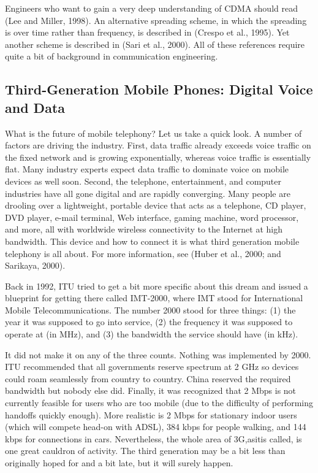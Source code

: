\documentclass[b5paper,11pt]{memoir}
\begin{document}
Engineers who want to gain a very deep understanding of CDMA should read
(Lee and Miller, 1998). An alternative spreading scheme, in which the
spreading is over time rather than frequency, is described in (Crespo et
al., 1995). Yet another scheme is described in (Sari et al., 2000). All
of these references require quite a bit of background in communication
engineering.

\protect\hypertarget{0130661023_ch02lev1sec6.htmlux5cux23ch02lev2sec24}{}{}

\subsection{Third-Generation Mobile Phones: Digital Voice and Data}

What is the future of mobile telephony? Let us take a quick look. A
number of factors are driving the industry. First, data traffic already
exceeds voice traffic on the fixed network and is growing exponentially,
whereas voice traffic is essentially flat. Many industry experts expect
data traffic to dominate voice on mobile devices as well soon. Second,
the telephone, entertainment, and computer industries have all gone
digital and are rapidly converging. Many people are drooling over a
lightweight, portable device that acts as a telephone, CD player, DVD
player, e-mail terminal, Web interface, gaming machine, word processor,
and more, all with worldwide wireless connectivity to the Internet at
high bandwidth. This device and how to connect it is what third
generation mobile telephony is all about. For more information, see
(Huber et al., 2000; and Sarikaya, 2000).

Back in 1992, ITU tried to get a bit more specific about this dream and
issued a blueprint for getting there called {IMT-2000}, where IMT stood
for {International Mobile Telecommunications}. The number 2000 stood for
three things: (1) the year it was supposed to go into service, (2) the
frequency it was supposed to operate at (in MHz), and (3) the bandwidth
the service should have (in kHz).

It did not make it on any of the three counts. Nothing was implemented
by 2000. ITU recommended that all governments reserve spectrum at 2 GHz
so devices could roam seamlessly from country to country. China reserved
the required bandwidth but nobody else did. Finally, it was recognized
that 2 Mbps is not currently feasible for users who are {too} mobile
(due to the difficulty of performing handoffs quickly enough). More
realistic is 2 Mbps for stationary indoor users (which will compete
head-on with ADSL), 384 kbps for people walking, and 144 kbps for
connections in cars. Nevertheless, the whole area of {3G},asitis called,
is one great cauldron of activity. The third generation may be a bit
less than originally hoped for and a bit late, but it will surely
happen.
\end{document}
